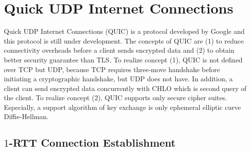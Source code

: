 \section{Quick UDP Internet Connections} \label{sec:quic}

Quick UDP Internet Connections (QUIC) is a protocol
developed by Google and this protocol is still under
development.
The concepts of QUIC are (1) to reduce connectivity
overheads before a client sends encrypted data and
(2) to obtain better security guarantee than TLS.
To realize concept (1), QUIC is not defined over
TCP but UDP, because TCP requires three-move handshake
before initiating a cryptographic handshake, but UDP
does not have. In addition, a client can send encrypted
data concurrently with CHLO which is second query of the
client.
To realize concept (2), QUIC supports only secure cipher
suites. Especially, a support algorithm of key exchange
is only ephemeral elliptic curve Diffie-Hellman.

\subsection{$1$-RTT Connection Establishment} \label{sec:quic_1rtt}

